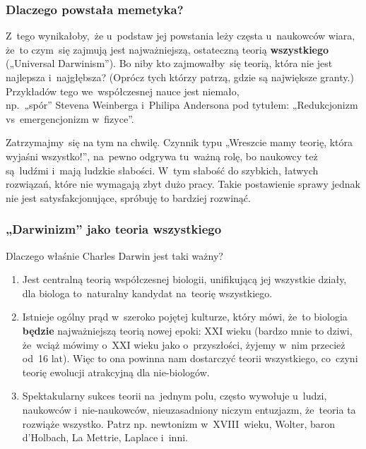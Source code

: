 \documentclass[10pt,t]{beamer}
\begin{document}
\begin{frame}
  \frametitle{Dlaczego powstała memetyka?}


  Z~tego wynikałoby,~że
  u~podstaw jej powstania leży częsta u~naukowców wiara, że~to
  czym~się zajmują jest najważniejszą, ostateczną teorią
  \textbf{wszystkiego} („Universal Darwinism”). Bo niby kto
  zajmowałby~się teorią, która nie jest najlepsza i~najgłębsza?
  (Oprócz tych którzy patrzą, gdzie są największe granty.)
  Przykładów tego we~współczesnej nauce jest niemało, \\
  np.~„spór” Stevena Weinberga i~Philipa Andersona pod tytułem:
  „Redukcjonizm vs~emergencjonizm w~fizyce”.

  Zatrzymajmy~się na tym na chwilę. Czynnik typu „Wreszcie mamy teorię,
  która wyjaśni wszystko!”,
  na~pewno odgrywa tu~ważną rolę, bo naukowcy też są~ludźmi i~mają
  ludzkie słabości. W~tym słabość do szybkich, łatwych rozwiązań,
  które nie wymagają zbyt dużo pracy. Takie postawienie sprawy
  jednak nie jest satysfakcjonujące, spróbuję to bardziej rozwinąć.

\end{frame}





\begin{frame}
  \frametitle{„Darwinizm” jako teoria wszystkiego}


  Dlaczego właśnie Charles Darwin jest taki ważny?

  \begin{enumerate}

  \item Jest centralną teorią współczesnej biologii, unifikującą jej
    wszystkie działy, dla biologa to~naturalny kandydat na~teorię
    wszystkiego.

  \item Istnieje ogólny prąd w~szeroko pojętej kulturze, który mówi,
    że~to biologia \textbf{będzie} najważniejszą teorią nowej epoki: XXI
    wieku (bardzo mnie to dziwi, że~wciąż mówimy o~XXI wieku jako
    o~przyszłości, żyjemy w~nim przecież od~16 lat). Więc to ona
    powinna nam dostarczyć teorii wszystkiego, co~czyni teorię
    ewolucji atrakcyjną dla nie-biologów.

  \item Spektakularny sukces teorii na~jednym polu, często wywołuje
    u~ludzi, naukowców i~nie-naukowców, nieuzasadniony niczym
    entuzjazm, że~teoria ta rozwiąże wszystko. Patrz np. newtonizm
    w~XVIII~wieku, Wolter, baron d'Holbach, La Mettrie, Laplace
    i~inni.

  \end{enumerate}

\end{frame}
\end{document}
